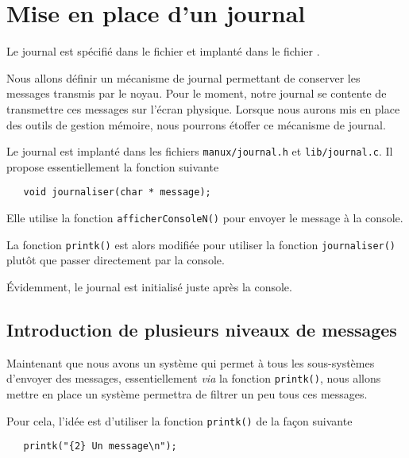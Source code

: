 \section{Mise en place d'un journal}

   Le journal est spécifié dans le fichier
 et implanté dans le fichier
.
   
   Nous allons définir un mécanisme de journal permettant de conserver
les messages transmis par le noyau. Pour le moment, notre journal se
contente de transmettre ces messages sur l'écran physique. Lorsque
nous aurons mis en place des outils de gestion mémoire, nous pourrons
étoffer ce mécanisme de journal.

   Le journal est implanté dans les fichiers
\lstinline!manux/journal.h! et \lstinline!lib/journal.c!. Il
propose essentiellement la fonction suivante

\begin{lstlisting}
   void journaliser(char * message); 
\end{lstlisting}

   Elle utilise la fonction \lstinline!afficherConsoleN()! pour
envoyer le message à la console.

   La fonction \lstinline!printk()! est alors modifiée pour utiliser la
fonction \lstinline!journaliser()! plutôt que passer directement par
la console.

   Évidemment, le journal est initialisé juste après la console.

%
\subsection{Introduction de plusieurs niveaux de messages}

   Maintenant que nous avons un système qui permet à tous les
sous-systèmes d'envoyer des messages, essentiellement {\em via} la
fonction \lstinline!printk()!, nous allons mettre en place un système
permettra de filtrer un peu tous ces messages.

   Pour cela, l'idée est d'utiliser la fonction \lstinline!printk()!
de la façon suivante

\begin{lstlisting}
   printk("{2} Un message\n");
\end{lstlisting}

